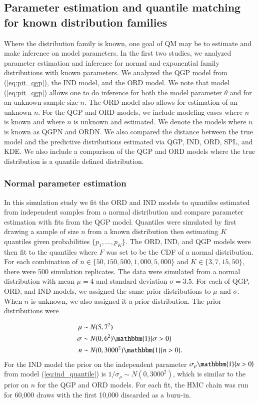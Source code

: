 \documentclass[preprint,12pt,authoryear]{elsarticle}
\begin{document}
\subsection{Parameter estimation and quantile matching for known distribution families} 

Where the distribution family is known, one goal of QM may be to estimate and make inference on model parameters. In the first two studies, we analyzed parameter estimation and inference for normal and exponential family distributions with known parameters. We analyzed the QGP model from (\ref{eq:pit_qgp}), the IND model, and the ORD model. We note that model (\ref{eq:pit_qgp}) allows one to do inference for both the model parameter $\theta$ and for an unknown sample size $n$. The ORD model also allows for estimation of an unknown $n$. For the QGP and ORD models, we include modeling cases where $n$ is known and where $n$ is unknown and estimated. We denote the models where $n$ is known as QGPN and ORDN. We also compared the distance between the true model and the predictive distributions estimated via QGP, IND, ORD, SPL, and KDE. We also include a comparison of the QGP and ORD models where the true distribution is a quantile defined distribution.

\subsubsection{Normal parameter estimation}
In this simulation study we fit the ORD and IND models to quantiles estimated from independent samples from a normal distribution and compare parameter estimation with fits from the QGP model. Quantiles were simulated by first drawing a sample of size $n$ from a known distribution then estimating $K$ quantiles given probabilities $\{p_1, ..., p_K\}$. The ORD, IND, and QGP models were then fit to the quantiles where $F$ was set to be the CDF of a normal distribution. For each combination of $n \in \{50, 150, 500, 1{,}000, 5{,}000\}$ and $K \in \{3,7,15,50\}$, there were 500 simulation replicates. The data were simulated from a normal distribution with mean $\mu = 4$ and standard deviation $\sigma = 3.5$.
For each of QGP, ORD, and IND models, we assigned the same prior distributions to $\mu$ and $\sigma$. When $n$ is unknown, we also assigned it a prior distribution. The prior distributions were

\begin{align*}
    \mu &\sim N(5,7^2) \\
    \sigma &\sim N(0, 6^2)\mathbbm{1}\{\sigma > 0\} \\
    n &\sim N(0,3000^2)\mathbbm{1}\{n > 0\}.
\end{align*}
For the IND model the prior on the independent parameter $\sigma_{\rho}\mathbbm{1}\{n > 0\}$ from model (\ref{eq:ind_quantile}) is $1/\sigma_{\rho} \sim N(0, 3000^2)$, which is similar to the prior on $n$ for the QGP and ORD models. For each fit, the HMC chain was run for 60,000 draws with the first 10,000 discarded as a burn-in.
\end{document}
